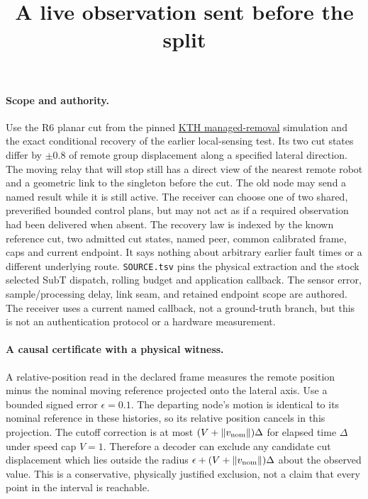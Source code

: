 \documentclass{article}
\title{A live observation sent before the split}
\date{}
\begin{document}
\maketitle

\paragraph{Scope and authority.}
Use the R6 planar cut from the pinned
\href{https://arxiv.org/html/2609.29939v1}{KTH managed-removal}
simulation and the exact conditional recovery of the earlier
local-sensing test. Its two cut states differ by $\pm0.8$ of
remote group displacement along a specified lateral direction.
The moving relay that will stop still has a direct view of the
nearest remote robot and a geometric link to the singleton
before the cut. The old node may send a named result while
it is still active. The receiver can choose one of two
shared, preverified bounded control plans, but may not act
as if a required observation had been delivered when absent.
The recovery law is indexed by the known reference cut, two
admitted cut states, named peer, common calibrated frame, caps
and current endpoint. It says nothing about arbitrary earlier
fault times or a different underlying route.
\verb|SOURCE.tsv| pins the physical extraction and the stock
selected SubT dispatch, rolling budget and application callback.
The sensor error, sample/processing delay, link seam, and retained
endpoint scope are authored. The receiver uses a current named
callback, not a ground-truth branch, but this is not an
authentication protocol or a hardware measurement.

\paragraph{A causal certificate with a physical witness.}
A relative-position read in the declared frame measures the
remote position minus the nominal moving reference projected
onto the lateral axis. Use a bounded signed error $\epsilon=0.1$.
The departing node's motion is identical to its nominal
reference in these histories, so its relative position cancels
in this projection. The cutoff correction is at most
$(V+\|v_{\rm nom}\|)\Delta$ for elapsed time $\Delta$ under
speed cap $V=1$. Therefore a decoder can exclude any
candidate cut displacement which lies outside the radius
$\epsilon+(V+\|v_{\rm nom}\|)\Delta$ about the observed value.
This is a conservative, physically justified exclusion, not a
claim that every point in the interval is reachable.
\end{document}
